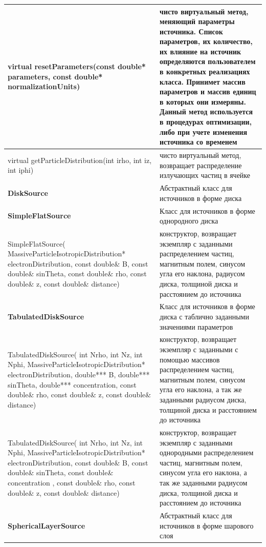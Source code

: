 \begin{small}
\begin{xtabular}{|p{0.5\textwidth}|p{0.5\textwidth}|}
		\hline
		virtual resetParameters(const double* parameters, const double* normalizationUnits) & чисто виртуальный метод, меняющий параметры источника. Список параметров, их количество, их влияние на источник определяются пользователем в конкретных реализациях класса. Принимет массив параметров и массив единиц в которых они измеряны. Данный метод используется в процедурах оптимизации, либо при учете изменения источника со временем\\
		\hline
		virtual getParticleDistribution(int irho, int iz, int iphi) & чисто виртуальный метод, возвращает распределение излучающих частиц в ячейке\\
		\hline
		\textbf{DiskSource} & Абстрактный класс для источников в форме диска\\
		\hline
		\textbf{SimpleFlatSource} & Класс для источников в форме однородного диска\\
		\hline
		SimpleFlatSource( MassiveParticleIsotropicDistribution* electronDistribution, const double\& B, const double\& sinTheta, const double\& rho, const double\& z, const double\& distance) & конструктор, возвращает экземпляр с заданными распределением частиц, магнитным полем, синусом угла его наклона, радиусом диска, толщиной диска и расстоянием до источника\\
		\hline
		\textbf{TabulatedDiskSource} & Класс для источников в форме диска с таблично заданными значениями параметров\\
		\hline
		TabulatedDiskSource( int Nrho, int Nz, int Nphi, MassiveParticleIsotropicDistribution* electronDistribution, double*** B, double*** sinTheta, double*** concentration, const double\& rho, const double\& z, const double\& distance) & конструктор, возвращает экземпляр с заданными с помощью массивов распределением частиц, магнитным полем, синусом угла его наклона, а так же заданными радиусом диска, толщиной диска и расстоянием до источника\\
		\hline
		TabulatedDiskSource( int Nrho, int Nz, int Nphi, MassiveParticleIsotropicDistribution* electronDistribution, const double\& B, const double\& sinTheta, const double\& concentration , const double\& rho, const double\& z, const double\& distance) & конструктор, возвращает экземпляр с заданными однородными распределением частиц, магнитным полем, синусом угла его наклона, а так же заданными радиусом диска, толщиной диска и расстоянием до источника\\
		\hline
		\textbf{SphericalLayerSource} & Абстрактный класс для источников в форме шарового слоя\\

\end{xtabular}
\end{small}
